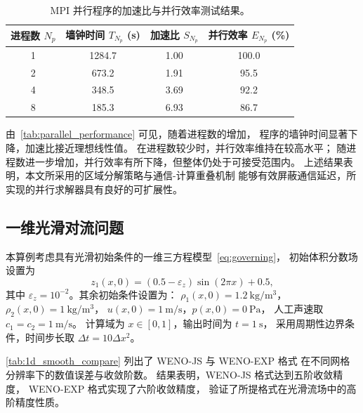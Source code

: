 \documentclass[12pt,a4paper]{article}
\numberwithin{equation}{section}    %
\begin{document}
\begin{table}[!htbp]
    \centering
    \caption{MPI 并行程序的加速比与并行效率测试结果。}
    \label{tab:parallel_performance}
    \begin{tabular}{cccc}
        \toprule
        进程数 $N_p$ & 墙钟时间 $T_{N_p}$ (s) & 加速比 $S_{N_p}$ & 并行效率 $E_{N_p}$ (\%) \\
        \midrule
        1 & 1284.7 & 1.00 & 100.0 \\
        2 &  673.2 & 1.91 &  95.5 \\
        4 &  348.5 & 3.69 &  92.2 \\
        8 &  185.3 & 6.93 &  86.7 \\
        \bottomrule
    \end{tabular}
\end{table}

由~\autoref{tab:parallel_performance} 可见，随着进程数的增加，
程序的墙钟时间显著下降，加速比接近理想线性值。
在进程数较少时，并行效率维持在较高水平；
随进程数进一步增加，并行效率有所下降，但整体仍处于可接受范围内。
上述结果表明，本文所采用的区域分解策略与通信-计算重叠机制
能够有效屏蔽通信延迟，所实现的并行求解器具有良好的可扩展性。


\subsection{一维光滑对流问题}
\label{sec:1D_smooth_advection}

本算例考虑具有光滑初始条件的一维三方程模型~\eqref{eq:governing}，
初始体积分数场设置为
\begin{equation}
    z_1(x, 0) = (0.5 - \varepsilon_z)\sin(2\pi x) + 0.5,
\end{equation}
其中 $\varepsilon_z = 10^{-2}$。其余初始条件设置为：
$\rho_1(x, 0) = 1.2~\mathrm{kg/m^3}$，$\rho_2(x, 0) = 1~\mathrm{kg/m^3}$，
$u(x, 0) = 1~\mathrm{m/s}$，$p(x, 0) = 0~\mathrm{Pa}$，
人工声速取 $c_1 = c_2 = 1~\mathrm{m/s}$。
计算域为 $x \in [0, 1]$，输出时间为 $t = 1~\mathrm{s}$，
采用周期性边界条件，时间步长取 $\Delta t = 10\Delta x^2$。

\autoref{tab:1d_smooth_compare} 列出了 WENO-JS 与 WENO-EXP 格式
在不同网格分辨率下的数值误差与收敛阶数。
结果表明，WENO-JS 格式达到五阶收敛精度，
WENO-EXP 格式实现了六阶收敛精度，
验证了所提格式在光滑流场中的高阶精度性质。
\end{document}
